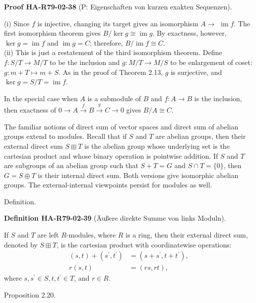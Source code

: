 \documentclass[10pt, letterpaper]{article}
\newcommand{\CustomHeading}[3]{%
  \par\medskip\noindent%
  \textbf{#1 #2} \textnormal{(#3)}.\enskip%
}
\newenvironment{DEF}[2]{\begin{unitbox}\CustomHeading{Definition}{#1}{#2}}{\end{unitbox}}
\newenvironment{PROOF}[2]{\begin{unitbox}\CustomHeading{Proof}{#1}{#2}}{\end{unitbox}}
\begin{document}
\begin{PROOF}{HA-R79-02-38}{P: Eigenschaften von kurzen exakten Sequenzen}
(i) Since $f$ is injective, changing its target gives an isomorphism $A \rightarrow$ $\operatorname{im} f$. The first isomorphism theorem gives $B / \operatorname{ker} g \cong \operatorname{im} g$. By exactness, however, $\operatorname{ker} g=\operatorname{im} f$ and $\operatorname{im} g=C$; therefore, $B / \operatorname{im} f \cong C$.\\

(ii) This is just a restatement of the third isomorphism theorem. Define $f: S / T \rightarrow M / T$ to be the inclusion and $g: M / T \rightarrow M / S$ to be enlargement of coset: $g: m+T \mapsto m+S$. As in the proof of Theorem 2.13, $g$ is surjective, and $\operatorname{ker} g=S / T=\operatorname{im} f$.

In the special case when $A$ is a submodule of $B$ and $f: A \rightarrow B$ is the inclusion, then exactness of $0 \rightarrow A \xrightarrow{f} B \xrightarrow{g} C \rightarrow 0$ gives $B / A \cong C$.
\end{PROOF}

The familiar notions of direct sum of vector spaces and direct sum of abelian groups extend to modules. Recall that if $S$ and $T$ are abelian groups, then their external direct sum $S \boxplus T$ is the abelian group whose underlying set is the cartesian product and whose binary operation is pointwise addition. If $S$ and $T$ are subgroups of an abelian group such that $S+T=G$ and $S \cap T=\{0\}$, then $G=S \oplus T$ is their internal direct sum. Both versions give isomorphic abelian groups. The external-internal viewpoints persist for modules as well.

Definition. 


\begin{DEF}{HA-R79-02-39}{Äußere direkte Summe von links Moduln}
If $S$ and $T$ are left $R$-modules, where $R$ is a ring, then their external direct sum, denoted by $S \boxplus T$, is the cartesian product with coordinatewise operations:
$$
\begin{aligned}
(s, t)+\left(s^{\prime}, t^{\prime}\right) & =\left(s+s^{\prime}, t+t^{\prime}\right), \\
r(s, t) & =(r s, r t),
\end{aligned}
$$
where $s, s^{\prime} \in S, t, t^{\prime} \in T$, and $r \in R$.
\end{DEF}


Proposition 2.20. 
\end{document}
